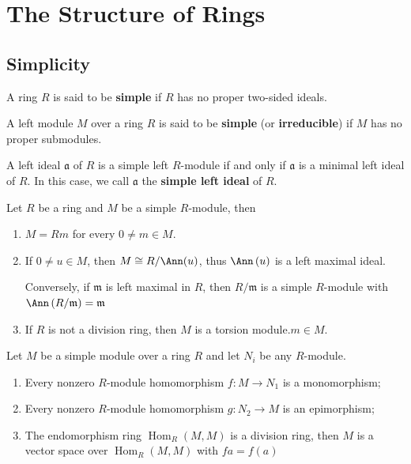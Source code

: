 \chapter{The Structure of Rings}


\section{Simplicity} %
\begin{definition}
    A ring $R$ is said to be \textbf{simple} if $R$ has no proper two-sided ideals.
\end{definition}

\begin{definition}
    A left module $M$ over a ring $R$ is said to be \textbf{simple} (or \textbf{irreducible}) if $M$ has no proper submodules.
    \begin{remark}
        A left ideal $\mathfrak{a}$ of $R$ is a simple left $R$-module if and only if $\mathfrak{a}$ is a minimal left ideal of $R$.
        In this case, we call $\mathfrak{a}$ the \textbf{simple left ideal} of $R$.
    \end{remark}
\end{definition}
\begin{proposition}
    \label{pro: Proposition of simple module}
    Let $R$ be a ring and $M$ be a simple $R$-module, then
    \begin{enumerate}
        \item
              $M=Rm$ for every $0 \neq m \in M$.
        \item
              If $0 \neq u \in M$, then $M \cong R / \Ann(u)$, thus $\Ann\left( u \right)$ is a left maximal ideal.

              Conversely, if $\mathfrak{m}$ is left maximal in $R$, then $R/\mathfrak{m}$ is a simple $R$-module with $\Ann\left( R/\mathfrak{m} \right)=\mathfrak{m}$
        \item
              If $R$ is not a division ring, then $M$ is a torsion module.$m\in M$.
    \end{enumerate}
\end{proposition}

\begin{lemma}[Schur]
    \label{lem: Schur's lemma}
    Let $M$ be a simple module over a ring $R$ and let $N_i$ be any $R$-module.
    \begin{enumerate}
        \item
              Every nonzero $R$-module homomorphism $f: M \rightarrow N_1$ is a monomorphism;
        \item
              Every nonzero $R$-module homomorphism $g: N_2 \rightarrow M$ is an epimorphism;

        \item
              The endomorphism ring $\operatorname{Hom}_{R}(M,M)$ is a division ring,
              then $M$ is a vector space over $\operatorname{Hom}_R(M,M)$ with $f a=f(a)$
    \end{enumerate}
\end{lemma}





